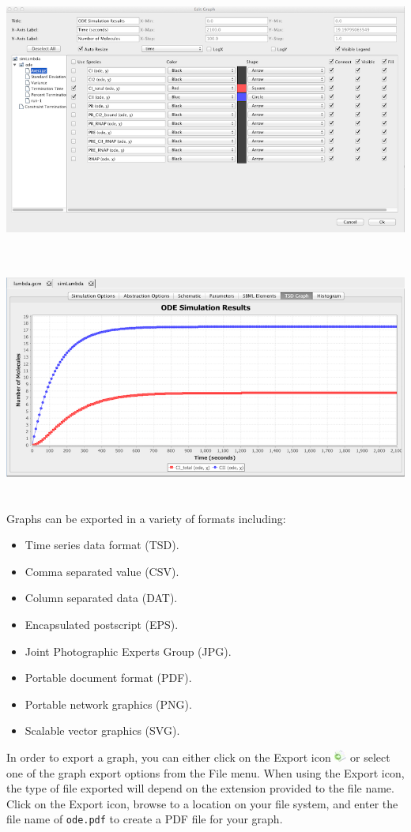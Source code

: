 \documentclass[titlepage,11pt]{article}
\begin{document}
\begin{center}
\includegraphics[height=90mm]{screenshots/odeResults}\\
\includegraphics[height=80mm]{screenshots/odeSimResults}
\end{center}

Graphs can be exported in a variety of formats including:
\begin{itemize}
\item Time series data format (TSD).
\item Comma separated value (CSV).
\item Column separated data (DAT).
\item Encapsulated postscript (EPS). 
\item Joint Photographic Experts Group (JPG). 
\item Portable document format (PDF).
\item Portable network graphics (PNG). 
\item Scalable vector graphics (SVG).
\end{itemize}
In order to export a graph, you can either click on the Export icon \includegraphics{../gui/icons/export} or select one of the graph export options from the File menu.  When using the Export icon, the type of file exported will depend on the extension provided to the file name.  Click on the Export icon, browse to a location on your file system, and enter the file name of {\tt ode.pdf} to create a PDF file for your graph.
\end{document}

